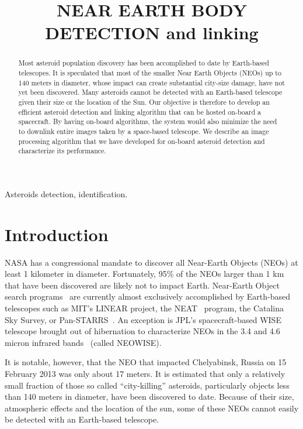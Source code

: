 \documentclass{article}
\title{NEAR EARTH BODY DETECTION and linking}
\begin{document}
%
\maketitle
%
\begin{abstract}
Most asteroid population discovery has been accomplished to date by Earth-based telescopes. It is speculated that most of the smaller Near Earth Objects (NEOs) up to 140 meters in diameter, whose impact can create substantial city-size damage, have not yet been discovered.  Many asteroids cannot be detected with an Earth-based telescope given their size or the location of the Sun.  Our objective is therefore to develop an efficient asteroid detection and linking algorithm that can be hosted on-board a spacecraft.  By having on-board algorithms, the system would also minimize the need to downlink entire images taken by a space-based telescope. We describe an image processing algorithm that we have developed for on-board asteroid detection and characterize its performance.
 
\end{abstract}
%
\begin{keywords}
Asteroids detection, identification. 
\end{keywords}
%
\section{Introduction}
\label{sec:intro}

NASA has a congressional mandate to discover all Near-Earth Objects (NEOs) at least 1 kilometer in diameter.  Fortunately, 95\% of the NEOs larger than 1 km that have been discovered are likely not to impact Earth.  
Near-Earth Object search programs~\cite{stokes2002near} are currently almost exclusively accomplished by Earth-based telescopes such as MIT's LINEAR \cite{evans2003detection}  project, the NEAT~\cite{neat2014} program, the Catalina Sky Survey, or  Pan-STARRS~\cite{denneau2013pan}.  An exception is JPL's spacecraft-based WISE telescope brought out of hibernation to characterize NEOs in the 3.4 and 4.6 micron infrared bands~\cite{wise2014} (called NEOWISE). 

It is notable, however, that the NEO that impacted Chelyabinsk, Russia on 15 February 2013 was only about 17 meters.
It is estimated that only a relatively small fraction of those so called ``city-killing'' asteroids, particularly objects less than 140 meters in diameter, have been discovered to date. Because of their size, atmospheric effects and the location of the sun, some of these NEOs cannot easily be detected with an Earth-based telescope.  
\end{document}
